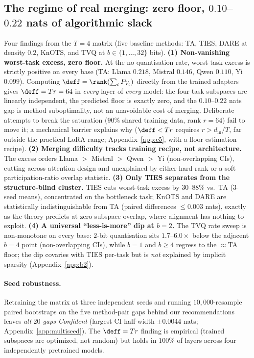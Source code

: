 \subsection{The regime of real merging: zero floor, $0.10$--$0.22$ nats
of algorithmic slack}
\label{subsec:exp-lora}\label{subsec:exp-multiseed}

Four findings from the $T = 4$ matrix (five baseline methods: TA, TIES,
DARE at density $0.2$, KnOTS, and TVQ at $b \in \{1,\dots,32\}$ bits).
\textbf{(1) Non-vanishing worst-task excess, zero floor.} At the
no-quantisation rate, worst-task excess is strictly positive on every
base (TA: Llama $0.218$, Mistral $0.146$, Qwen $0.110$, Yi $0.099$).
Computing $\deff = \rank(\sum_t P_{V_t})$
directly from the trained adapters gives $\deff = Tr = 64$ in
\emph{every} layer of \emph{every} model: the four task subspaces are
linearly independent, the predicted floor is exactly zero, and the
$0.10$--$0.22$ nats gap is method suboptimality, not an unavoidable
cost of merging. Deliberate attempts to break the saturation ($90\%$
shared training data, rank $r = 64$) fail to move it; a mechanical
barrier explains why ($\deff < Tr$ requires $r > d_{\mathrm{in}}/T$,
far outside the practical LoRA range; Appendix~\ref{app:e5}, with a
floor-estimation recipe). \textbf{(2) Merging difficulty tracks
training recipe, not architecture.} The excess orders Llama $>$
Mistral $>$ Qwen $>$ Yi (non-overlapping CIs), cutting across
attention design and unexplained by either hard rank or a soft
participation-ratio overlap statistic. \textbf{(3) Only TIES
separates from the structure-blind cluster.} TIES cuts worst-task
excess by $30$--$88\%$ vs.\ TA ($3$-seed means), concentrated on the
bottleneck task; KnOTS and DARE are statistically indistinguishable
from TA (paired differences $\leq 0.003$ nats), exactly as the
theory predicts at zero subspace overlap, where alignment has nothing
to exploit. \textbf{(4) A universal ``less-is-more'' dip at $b=2$.}
The TVQ rate sweep is non-monotone on every base: $2$-bit quantisation
sits $1.7$--$6.0\times$ below the adjacent $b = 4$ point
(non-overlapping CIs), while $b = 1$ and $b \geq 4$ regress to the
$\approx$TA floor; the dip covaries with TIES per-task but is
\emph{not} explained by implicit sparsity (Appendix~\ref{app:b2}).

\paragraph{Seed robustness.} Retraining the matrix at three
independent seeds and running $10{,}000$-resample paired bootstraps on
the five method-pair gaps behind our recommendations leaves \emph{all
$20$ gaps Confident} (largest CI half-width $\pm 0.0044$ nats;
Appendix~\ref{app:multiseed}). The $\deff = Tr$ finding is empirical
(trained subspaces are optimized, not random) but holds in
$100\%$ of layers across four independently pretrained models.

